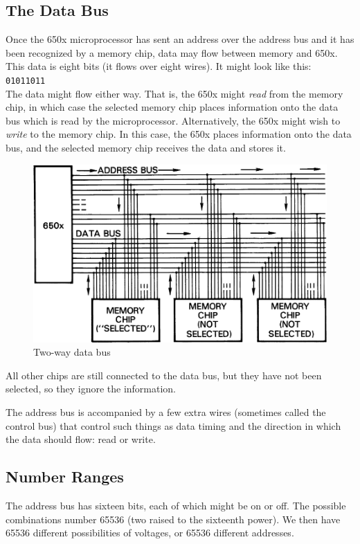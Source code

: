 \documentclass[11pt,a4paper,titlepage]{memoir}
\begin{document}
\subsection{The Data Bus}
Once the 650x microprocessor has sent an address over the address bus and it has been recognized by a memory chip, data may flow between memory and 650x. This data is eight bits (it flows over eight wires). It might look like this:\\

\texttt{01011011}\\

The data might flow either way. That is, the 650x might \emph{read} from the memory chip, in which case the selected memory chip places information onto the data bus which is read by the microprocessor. Alternatively, the 650x might wish to \emph{write} to the memory chip. In this case, the 650x places information onto the data bus, and the selected memory chip receives the data and stores it.
\begin{figure}[h!]
	\centering
	\includegraphics[width=1\linewidth]{screenshot004}
	\caption{Two-way data bus}
	\label{fig:screenshot004}
\end{figure}

All other chips are still connected to the data bus, but they have not been
selected, so they ignore the information.

The address bus is accompanied by a few extra wires (sometimes called the control bus) that control such things as data timing and the direction
in which the data should flow: read or write.
\subsection{Number Ranges}
The address bus has sixteen bits, each of which might be on or off. The
possible combinations number 65536 (two raised to the sixteenth power).
We then have 65536 different possibilities of voltages, or 65536 different
addresses.
\end{document}
